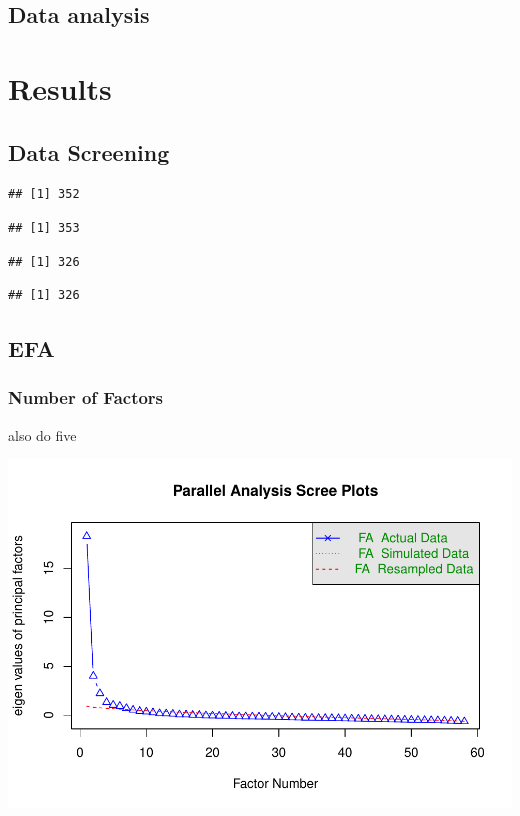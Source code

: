 \documentclass[
  man]{apa6}
\begin{document}
\subsection{Data analysis}\label{data-analysis}

\section{Results}\label{results}

\subsection{Data Screening}\label{data-screening}

\begin{verbatim}
## [1] 352
\end{verbatim}

\begin{verbatim}
## [1] 353
\end{verbatim}

\begin{verbatim}
## [1] 326
\end{verbatim}

\begin{verbatim}
## [1] 326
\end{verbatim}

\subsection{EFA}\label{efa}

\subsubsection{Number of Factors}\label{number-of-factors}

also do five

\includegraphics{manuscript_files/figure-latex/unnamed-chunk-1-1.pdf}
\end{document}
